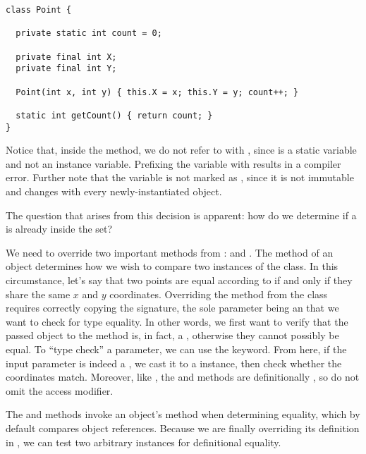 \begin{lstlisting}[language=MyJava]
class Point {

  private static int count = 0;

  private final int X;
  private final int Y;

  Point(int x, int y) { this.X = x; this.Y = y; count++; }

  static int getCount() { return count; }
}
\end{lstlisting}

Notice that, inside the  method, we do not refer to  with , since  is a static variable and not an instance variable. Prefixing the  variable with  results in a compiler error. Further note that the variable is not marked as , since it is not immutable and changes with every newly-instantiated  object.

 The question that arises from this decision is apparent: how do we determine if a  is already inside the set? 

We need to override two important methods from :  and . The  method of an object determines how we wish to compare two instances of the class. In this circumstance, let's say that two points are equal according to  if and only if they share the same $x$ and $y$ coordinates. Overriding the  method from the  class requires correctly copying the signature, the sole parameter being an  that we want to check for type equality. In other words, we first want to verify that the passed object to the  method is, in fact, a , otherwise they cannot possibly be equal. To ``type check'' a parameter, we can use the  keyword. From here, if the input parameter is indeed a , we cast it to a  instance, then check whether the coordinates match. Moreover, like , the  and  methods are definitionally , so do not omit the access modifier.

The  and  methods invoke an object's  method when determining equality, which by default compares object references. Because we are finally overriding its definition in , we can test two arbitrary  instances for definitional equality.

